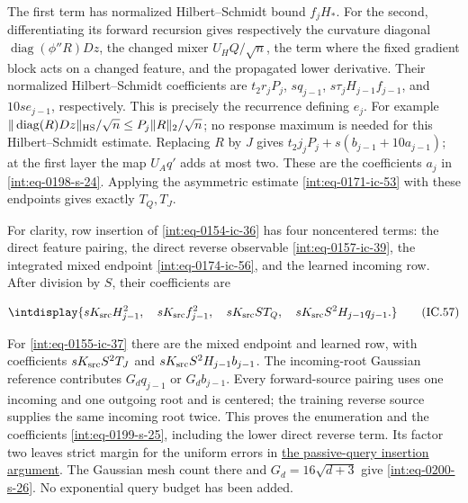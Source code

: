 The first term has normalized Hilbert--Schmidt bound \(f_jH_*\). For the second, differentiating its forward recursion gives respectively the curvature diagonal \(\operatorname{diag}(\phi''R)Dz\), the changed mixer \(U_HQ/\sqrt n\), the term where the fixed gradient block acts on a changed feature, and the propagated lower derivative. Their normalized Hilbert--Schmidt coefficients are \(t_2r_jP_j\), \(sq_{j-1}\), \(s\tau_jH_{j-1}f_{j-1}\), and \(10s e_{j-1}\), respectively. This is precisely the recurrence defining \(e_j\). For example \(\|\operatorname{diag}(R)Dz\|_{\rm HS}/\sqrt n \le P_j\|R\|_2/\sqrt n\); no response maximum is needed for this Hilbert--Schmidt estimate. Replacing \(R\) by \(J\) gives \(t_2j_jP_j+s(b_{j-1}+10a_{j-1})\); at the first layer the map \(U_Aq'\) adds at most two. These are the coefficients \(a_j\) in \eqref{int:eq-0198-s-24}. Applying the asymmetric estimate \eqref{int:eq-0171-ic-53} with these endpoints gives exactly \(T_Q,\allowbreak T_J\).



For clarity, row insertion of \eqref{int:eq-0154-ic-36} has four noncentered terms: the direct feature pairing, the direct reverse observable \eqref{int:eq-0157-ic-39}, the integrated mixed endpoint \eqref{int:eq-0174-ic-56}, and the learned incoming row. After division by \(S\), their coefficients are


\begingroup\renewcommand{\theHequation}{intdisplay.362}
\begin{equation}
\intdisplay{
sK_{\rm src}H_{j-1}^2,\quad
 sK_{\rm src}f_{j-1}^2,\quad
 sK_{\rm src}ST_Q,\quad
 sK_{\rm src}S^2H_{j-1}q_{j-1}.
}
\tag{IC.57}
\label{int:eq-0175-ic-57}
\end{equation}
\endgroup


For \eqref{int:eq-0155-ic-37} there are the mixed endpoint and learned row, with coefficients \(sK_{\rm src}S^2T_J\) and \(sK_{\rm src}S^2H_{j-1}b_{j-1}\). The incoming-root Gaussian reference contributes \(G_dq_{j-1}\) or \(G_db_{j-1}\). Every forward-source pairing uses one incoming and one outgoing root and is centered; the training reverse source supplies the same incoming root twice. This proves the enumeration and the coefficients \eqref{int:eq-0199-s-25}, including the lower direct reverse term. Its factor two leaves strict margin for the uniform errors in \hyperref[int:source-passive-local]{the passive-query insertion argument}. The Gaussian mesh count there and \(G_d=16\sqrt{d+3}\) give \eqref{int:eq-0200-s-26}. No exponential query budget has been added.


